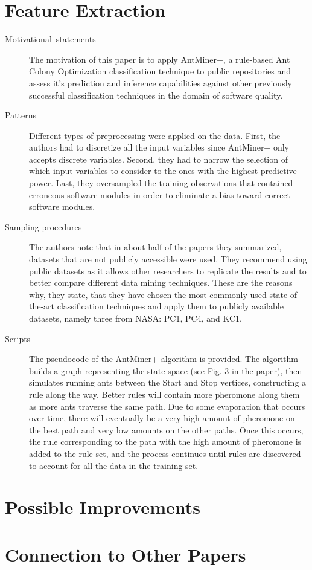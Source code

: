 \documentclass[english]{article}
\begin{document}
\section*{Feature Extraction}
\begin{description}
\item [{Motivational~statements}] The motivation of this paper is to apply AntMiner+, a rule-based Ant Colony Optimization classification technique to public repositories and assess it's prediction and inference capabilities against other previously successful classification techniques in the domain of software quality.
\item[{Patterns}] Different types of preprocessing were applied on the data. First, the authors had to discretize all the input variables since AntMiner+ only accepts discrete variables. Second, they had to narrow the selection of which input variables to consider to the ones with the highest predictive power. Last, they oversampled the training observations that contained erroneous software modules in order to eliminate a bias toward correct software modules.
\item[{Sampling procedures}] The authors note that in about half of the papers they summarized, datasets that are not publicly accessible were used. They recommend using public datasets as it allows other researchers to replicate the results and to better compare different data mining techniques. These are the reasons why, they state, that they have chosen the most commonly used state-of-the-art classification techniques and apply them to publicly available datasets, namely three from NASA: PC1, PC4, and KC1.
\item[{Scripts}] The pseudocode of the AntMiner+ algorithm is provided. The algorithm builds a graph representing the state space (see Fig. 3 in the paper), then simulates running ants between the Start and Stop vertices, constructing a rule along the way. Better rules will contain more pheromone along them as more ants traverse the same path. Due to some evaporation that occurs over time, there will eventually be a very high amount of pheromone on the best path and very low amounts on the other paths. Once this occurs, the rule corresponding to the path with the high amount of pheromone is added to the rule set, and the process continues until rules are discovered to account for all the data in the training set. 
\end{description}



\section*{Possible Improvements}


\section*{Connection to Other Papers}





\end{document}
